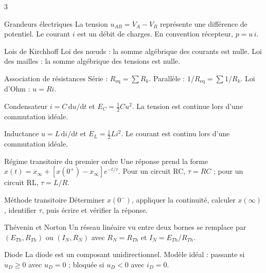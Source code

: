 \documentclass[a3paper,landscape,10pt]{article}
\begin{document}
\begin{multicols}{3}

\begin{TLPosterBloc}{Grandeurs électriques}
La tension $u_{AB}=V_A-V_B$ représente une différence de potentiel. Le courant $i$ est un débit de charges. En convention récepteur, $p=u\,i$.
\end{TLPosterBloc}

\begin{TLPosterBloc}{Lois de Kirchhoff}
Loi des nœuds : la somme algébrique des courants est nulle. Loi des mailles : la somme algébrique des tensions est nulle.
\end{TLPosterBloc}

\begin{TLPosterBloc}{Association de résistances}
Série : $R_{\mathrm{eq}}=\sum R_k$. Parallèle : $1/R_{\mathrm{eq}}=\sum 1/R_k$. Loi d'Ohm : $u=Ri$.
\end{TLPosterBloc}

\begin{TLPosterBloc}{Condensateur}
$i=C\,\mathrm{d}u/\mathrm{d}t$ et $E_C=\frac12Cu^2$. La tension est continue lors d'une commutation idéale.
\end{TLPosterBloc}

\begin{TLPosterBloc}{Inductance}
$u=L\,\mathrm{d}i/\mathrm{d}t$ et $E_L=\frac12Li^2$. Le courant est continu lors d'une commutation idéale.
\end{TLPosterBloc}

\begin{TLPosterBloc}{Régime transitoire du premier ordre}
Une réponse prend la forme $x(t)=x_\infty+[x(0^+)-x_\infty]e^{-t/\tau}$. Pour un circuit RC, $\tau=RC$ ; pour un circuit RL, $\tau=L/R$.
\end{TLPosterBloc}

\begin{TLPosterBloc}{Méthode transitoire}
Déterminer $x(0^-)$, appliquer la continuité, calculer $x(\infty)$, identifier $\tau$, puis écrire et vérifier la réponse.
\end{TLPosterBloc}

\begin{TLPosterBloc}{Thévenin et Norton}
Un réseau linéaire vu entre deux bornes se remplace par $(E_{Th},R_{Th})$ ou $(I_N,R_N)$ avec $R_N=R_{Th}$ et $I_N=E_{Th}/R_{Th}$.
\end{TLPosterBloc}

\begin{TLPosterBloc}{Diode}
La diode est un composant unidirectionnel. Modèle idéal : passante si $u_D\geq0$ avec $u_D=0$ ; bloquée si $u_D<0$ avec $i_D=0$.
\end{TLPosterBloc}


\end{multicols}
\end{document}
